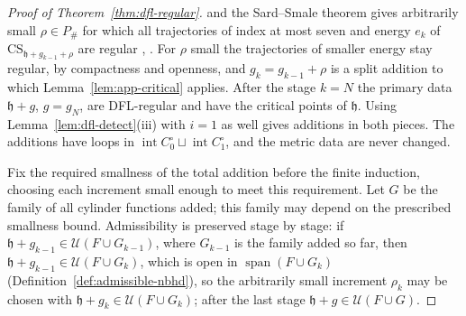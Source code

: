 \documentclass[11pt]{amsart}
\theoremstyle{definition}
\theoremstyle{remark}
\theoremstyle{plain}
\numberwithin{equation}{section}
\begin{document}
\begin{proof}[Proof of Theorem~\ref{thm:dfl-regular}]
and the Sard--Smale theorem gives arbitrarily small $\rho\in P_\#$ for which all trajectories of
index at most seven and energy $e_k$ of $\mathrm{CS}_{\mathfrak h+g_{k-1}+\rho}$ are regular \cite[p.~80]{DFL},
\cite[pp.~143--144]{Donaldson-book}. For $\rho$ small the trajectories of smaller energy stay regular,
by compactness and openness, and $g_k=g_{k-1}+\rho$ is a split addition to which
Lemma~\ref{lem:app-critical} applies. After the stage $k=N$ the primary data $\mathfrak h+g$,
$g=g_N$, are DFL-regular and have the critical points of $\mathfrak h$. Using
Lemma~\ref{lem:dfl-detect}(iii) with $i=1$ as well gives additions in both pieces. The additions
have loops in $\operatorname{int}C_0^\circ\sqcup\operatorname{int}C_1^\circ$, and the metric data are
never changed.

Fix the required smallness of the total addition before the finite induction, choosing each
increment small enough to meet this requirement. Let $G$ be the family of all cylinder
functions added; this family may depend on the prescribed smallness bound.
Admissibility is preserved stage by stage: if $\mathfrak h+g_{k-1}\in\mathcal U(F\cup G_{k-1})$,
where $G_{k-1}$ is the family added so far, then
$\mathfrak h+g_{k-1}\in\mathcal U(F\cup G_k)$, which is open in $\operatorname{span}(F\cup G_k)$
(Definition~\ref{def:admissible-nbhd}), so the arbitrarily small increment $\rho_k$ may be chosen
with $\mathfrak h+g_k\in\mathcal U(F\cup G_k)$; after the last stage
$\mathfrak h+g\in\mathcal U(F\cup G)$.
\end{proof}
\end{document}
